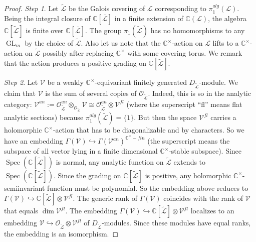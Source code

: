 \documentclass[12pt]{amsart}
\newcommand{\C}{\mathbb{C}}
\newcommand{\Leaf}{\mathcal{L}}
\theoremstyle{definition}
\begin{document}
\begin{proof}
{\it Step 1}. %
Let $\widetilde{\Leaf}$ be the  Galois covering of $\Leaf$ corresponding to $\pi_1^{alg}(\Leaf)$.
Being the integral closure of
$\C[\overline{\Leaf}]$ in a finite extension of $\C(\Leaf)$, the algebra $\C[\widetilde{\Leaf}]$
is finite over $\C[\overline{\Leaf}]$. The group $\pi_1(\widetilde{\Leaf})$ has no homomorphisms to
any $\operatorname{GL}_m$
by the choice of $\widetilde{\Leaf}$. Also let us note that the $\C^\times$-action on $\Leaf$
lifts to a $\C^\times$-action on $\widetilde{\Leaf}$ possibly after replacing $\C^\times$ with
some covering torus. We remark that the action produces a positive grading on $\C[\widetilde{\Leaf}]$.

{\it Step 2}. Let $\mathcal{V}$ be a weakly $\C^\times$-equivariant finitely generated $D_{\widetilde{\Leaf}}$-module.
We claim that $\mathcal{V}$ is the sum of several copies of $\mathcal{O}_{\widetilde{\Leaf}}$. Indeed,
this is so in the analytic category: $\mathcal{V}^{an}:=\mathcal{O}^{an}_{\widetilde{\Leaf}}\otimes_{\mathcal{O}_{\widetilde{\Leaf}}}\mathcal{V}\cong \mathcal{O}_{\widetilde{\Leaf}}^{an}\otimes\mathcal{V}^{fl}$ (where the superscript ``fl'' means flat
analytic sections)
because  $\pi^{alg}_1(\widetilde{\Leaf})=\{1\}$.
But then the space $\mathcal{V}^{fl}$ carries a holomorphic $\C^\times$-action that has to be diagonalizable
and by characters. So we have an embedding $\Gamma(\mathcal{V})\hookrightarrow \Gamma(\mathcal{V}^{an})^{\C^\times-fin}$
(the superscript means the subspace of all vector lying in a finite dimensional $\C^\times$-stable subspace).
Since $\operatorname{Spec}(\C[\widetilde{\Leaf}])$ is normal, any analytic function on
$\widetilde{\Leaf}$ extends to $\operatorname{Spec}(\C[\widetilde{\Leaf}])$. Since the grading on $\C[\widetilde{\Leaf}]$ is positive, any holomorphic $\C^\times$-semiinvariant function must be polynomial. So the embedding above
reduces to $\Gamma(\mathcal{V})\hookrightarrow \C[\widetilde{\Leaf}]\otimes \mathcal{V}^{fl}$.
The generic rank of $\Gamma(\mathcal{V})$ coincides with the rank of $\mathcal{V}$ that
equals $\dim \mathcal{V}^{fl}$. The embedding $\Gamma(\mathcal{V})\hookrightarrow \C[\widetilde{\Leaf}]\otimes \mathcal{V}^{fl}$ localizes to an embedding $\mathcal{V}\hookrightarrow \mathcal{O}_{\widetilde{\Leaf}}\otimes
\mathcal{V}^{fl}$ of $D_{\widetilde{\Leaf}}$-modules. Since these modules have equal ranks, the embedding
is an isomorphism.


\end{proof}
\end{document}
